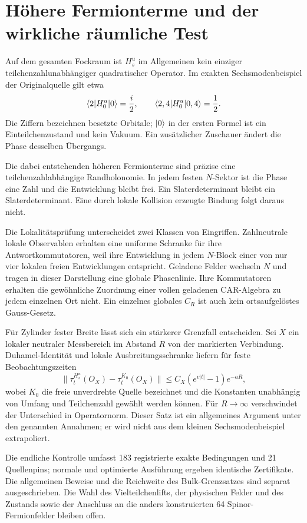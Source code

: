 \section{Höhere Fermionterme und der wirkliche räumliche Test}
Auf dem gesamten Fockraum ist $H_s^u$ im Allgemeinen kein einziger teilchenzahlunabhängiger quadratischer Operator. Im exakten Sechsmodenbeispiel der Originalquelle gilt etwa
\[
 \langle 2\rvert H_0^u\lvert 0\rangle=\frac i2,
 \qquad \langle 2,4\rvert H_0^u\lvert 0,4\rangle=\frac12.
\]
Die Ziffern bezeichnen besetzte Orbitale; $\lvert 0\rangle$ in der ersten Formel ist ein Einteilchenzustand und kein Vakuum. Ein zusätzlicher Zuschauer ändert die Phase desselben Übergangs.

Die dabei entstehenden höheren Fermionterme sind präzise eine teilchenzahlabhängige Randholonomie. In jedem festen $N$-Sektor ist die Phase eine Zahl und die Entwicklung bleibt frei. Ein Slaterdeterminant bleibt ein Slaterdeterminant. Eine durch lokale Kollision erzeugte Bindung folgt daraus nicht.

Die Lokalitätsprüfung unterscheidet zwei Klassen von Eingriffen. Zahlneutrale lokale Observablen erhalten eine uniforme Schranke für ihre Antwortkommutatoren, weil ihre Entwicklung in jedem $N$-Block einer von nur vier lokalen freien Entwicklungen entspricht. Geladene Felder wechseln $N$ und tragen in dieser Darstellung eine globale Phasenlinie. Ihre Kommutatoren erhalten die gewöhnliche Zuordnung einer vollen geladenen CAR-Algebra zu jedem einzelnen Ort nicht. Ein einzelnes globales $C_R$ ist auch kein ortsaufgelöstes Gauss-Gesetz.

Für Zylinder fester Breite lässt sich ein stärkerer Grenzfall entscheiden. Sei $X$ ein lokaler neutraler Messbereich im Abstand $R$ von der markierten Verbindung. Duhamel-Identität und lokale Ausbreitungsschranke liefern für feste Beobachtungszeiten
\[
 \|\tau_t^{H_s^u}(O_X)-\tau_t^{K_0}(O_X)\|
 \le C_X(e^{v|t|}-1)e^{-aR},
\]
wobei $K_0$ die freie unverdrehte Quelle bezeichnet und die Konstanten unabhängig von Umfang und Teilchenzahl gewählt werden können. Für $R\to\infty$ verschwindet der Unterschied in Operatornorm. Dieser Satz ist ein allgemeines Argument unter den genannten Annahmen; er wird nicht aus dem kleinen Sechsmodenbeispiel extrapoliert. 


Die endliche Kontrolle umfasst 183 registrierte exakte Bedingungen und 21 Quellenpins; normale und optimierte Ausführung ergeben identische Zertifikate. Die allgemeinen Beweise und die Reichweite des Bulk-Grenzsatzes sind separat ausgeschrieben. Die Wahl des Vielteilchenlifts, der physischen Felder und des Zustands sowie der Anschluss an die anders konstruierten 64 Spinor-Fermionfelder bleiben offen.

